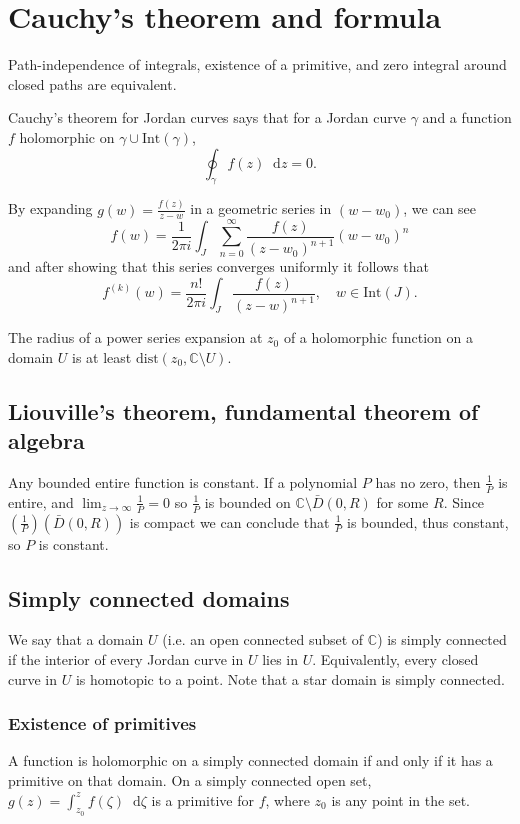 \documentclass{article}
\newcommand\dif{\mathop{}\!\mathrm{d}}
\begin{document}
\section{Cauchy's theorem and formula}

Path-independence of integrals, existence of a primitive,
and zero integral around closed paths are equivalent.

Cauchy's theorem for Jordan curves says that for a Jordan
curve $\gamma$ and a function $f$ holomorphic on
$\gamma \cup \mathrm{Int}(\gamma)$,
$$
  \oint_\gamma
    f(z)
    \dif z
= 0.
$$

By expanding $g(w) = \frac{f(z)}{z - w}$ in a geometric series in $(w
- w_0)$, we can see
$$
  f(w)
= \frac{1}{2 \pi i}
  \int_J
    \sum_{n=0}^\infty
      \frac{f(z)}{(z - w_0)^{n+1}}
      (w - w_0)^n
$$
and after showing that this series converges uniformly it follows that
$$
  f^{(k)}(w)
= \frac{n!}{2 \pi i}
  \int_J
    \frac{f(z)}
         {(z - w)^{n+1}}, \quad w \in \mathrm{Int}(J).
$$

The radius of a power series expansion at $z_0$ of a holomorphic function on a
domain $U$ is at least $\mathrm{dist}(z_0, \mathbb{C} \setminus U)$.

\subsection{Liouville's theorem, fundamental theorem of algebra}

Any bounded entire function is constant. If a polynomial $P$ has no
zero, then $\frac{1}{P}$ is entire, and
$\lim_{z \to \infty} \frac{1}{P} = 0$ so $\frac{1}{P}$ is bounded on
$\mathbb{C} \setminus \bar{D}(0, R)$ for some $R$. Since
$\left(\frac{1}{P}\right)(\bar{D}(0, R))$ is compact we can conclude
that $\frac{1}{P}$ is bounded, thus constant, so $P$ is constant.

\subsection{Simply connected domains}
We say that a domain $U$ (i.e. an open connected subset of $\mathbb{C}$)
is simply connected if the interior of every Jordan curve in $U$ lies
in $U$. Equivalently, every closed curve in $U$ is homotopic to a point.
Note that a star domain is simply connected.

\subsubsection{Existence of primitives}
A function is holomorphic on a simply connected domain if and only if
it has a primitive on that domain.
On a simply connected open set,
$g(z) = \int_{z_0}^z f(\zeta) \dif \zeta$ is a primitive for $f$,
where $z_0$ is any point in the set.
\end{document}
